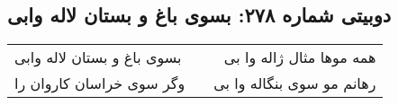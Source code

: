 \begin{center}
\section*{دوبیتی شماره ۲۷۸: بسوی باغ و بستان لاله وابی}
\label{sec:278}
\begin{longtable}{l p{0.5cm} r}
بسوی باغ و بستان لاله وابی
&&
همه موها مثال ژاله وا بی
\\
وگر سوی خراسان کاروان را
&&
رهانم مو سوی بنگاله وا بی
\\
\end{longtable}
\end{center}
